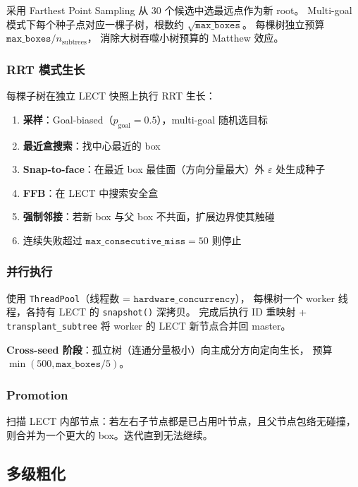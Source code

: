 \documentclass[11pt,a4paper]{article}
\begin{document}
采用 Farthest Point Sampling 从 30 个候选中选最远点作为新 root。
Multi-goal 模式下每个种子点对应一棵子树，根数约 $\sqrt{\texttt{max\_boxes}}$。
每棵树独立预算 $\texttt{max\_boxes} / n_{\mathrm{subtrees}}$，
消除大树吞噬小树预算的 Matthew 效应。

\subsubsection{RRT 模式生长}

每棵子树在独立 LECT 快照上执行 RRT 生长：

\begin{enumerate}[nosep]
  \item \textbf{采样}：Goal-biased（$p_{\mathrm{goal}} = 0.5$），multi-goal 随机选目标
  \item \textbf{最近盒搜索}：找中心最近的 box
  \item \textbf{Snap-to-face}：在最近 box 最佳面（方向分量最大）外 $\varepsilon$ 处生成种子
  \item \textbf{FFB}：在 LECT 中搜索安全盒
  \item \textbf{强制邻接}：若新 box 与父 box 不共面，扩展边界使其触碰
  \item 连续失败超过 $\texttt{max\_consecutive\_miss} = 50$ 则停止
\end{enumerate}

\subsubsection{并行执行}

使用 \texttt{ThreadPool}（线程数 = $\texttt{hardware\_concurrency}$），
每棵树一个 worker 线程，各持有 LECT 的 \texttt{snapshot()} 深拷贝。
完成后执行 ID 重映射 + \texttt{transplant\_subtree} 将 worker 的 LECT 新节点合并回 master。

\textbf{Cross-seed 阶段}：孤立树（连通分量极小）向主成分方向定向生长，
预算 $\min(500, \texttt{max\_boxes}/5)$。

\subsubsection{Promotion}

扫描 LECT 内部节点：若左右子节点都是已占用叶节点，且父节点包络无碰撞，
则合并为一个更大的 box。迭代直到无法继续。

\subsection{多级粗化}
\end{document}
